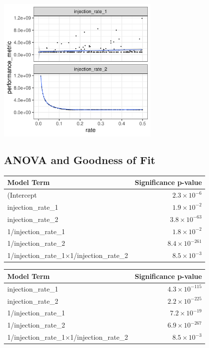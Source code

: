 \documentclass[a4paper]{article}
\begin{document}
\begin{center}
\includegraphics[width=0.6\textwidth]{./img/2_apps_min_mean_time/rs_20_samples_10_iterations_scatter.pdf}
\end{center}

\subsection{ANOVA and Goodness of Fit}
\label{sec:orgcfaeec5}
\begin{table}[ht]
\centering
\begin{tabular}{lr}
  \toprule
Model Term & Significance p-value \\
  \midrule
(Intercept & $2.3 \times 10^{-6}$ \\
  injection\_rate\_1 & $1.9 \times 10^{-2}$ \\
  injection\_rate\_2 & $3.8 \times 10^{-63}$ \\
  1/injection\_rate\_1 & $1.8 \times 10^{-2}$ \\
  1/injection\_rate\_2 & $8.4 \times 10^{-261}$ \\
  1/injection\_rate\_1$\times$1/injection\_rate\_2 & $8.5 \times 10^{-3}$ \\
   \bottomrule
\end{tabular}
\end{table}

\begin{table}[ht]
\centering
\begin{tabular}{lr}
  \toprule
Model Term & Significance p-value \\
  \midrule
injection\_rate\_1 & $4.3 \times 10^{-115}$ \\
  injection\_rate\_2 & $2.2 \times 10^{-225}$ \\
  1/injection\_rate\_1 & $7.2 \times 10^{-19}$ \\
  1/injection\_rate\_2 & $6.9 \times 10^{-267}$ \\
  1/injection\_rate\_1$\times$1/injection\_rate\_2 & $8.5 \times 10^{-3}$ \\
   \bottomrule
\end{tabular}
\end{table}
\end{document}
